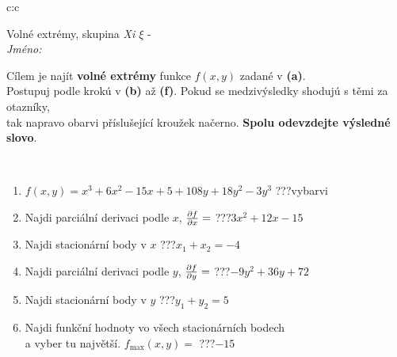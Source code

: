 \documentclass[10pt]{report}
\begin{document}
\newpage
\thispagestyle{empty}
\begin{tabular}{c:c}
\begin{minipage}[c][104.5mm][t]{0.5\linewidth}
\begin{center}
\vspace{7mm}
{\huge Volné extrémy, skupina \textit{Xi $\xi$} -}\\[5mm]
\textit{Jméno:}\phantom{xxxxxxxxxxxxxxxxxxxxxxxxxxxxxxxxxxxxxxxxxxxxxxxxxxxxxxxxxxxxxxxxx}\\[5mm]
\begin{minipage}{0.95\linewidth}
\begin{center}
Cílem je najít \textbf{volné extrémy} funkce $f(x,y)$ zadané v \textbf{(a)}.\\Postupuj podle krokú v \textbf{(b)} až \textbf{(f)}. Pokud se medzivýsledky shodujú s těmi za otazníky,\\tak napravo obarvi příslušející kroužek načerno. \textbf{Spolu odevzdejte výsledné slovo}.
\end{center}
\end{minipage}
\\[1mm]
\begin{minipage}{0.79\linewidth}
\begin{center}
\begin{varwidth}{\linewidth}
\begin{enumerate}
\normalsize
\item $f(x,y)=x^3+6x^2-15x+5+108y+18y^2-3y^3$\quad \dotfill\; ???\;\dotfill \quad vybarvi
\item Najdi parciální derivaci podle $x$, $\pdv{f}{x}=$\quad \dotfill\; ???\;\dotfill \quad $3x^2+12x-15$
\item Najdi stacionární body v $x$\quad \dotfill\; ???\;\dotfill \quad $x_1+x_2=-4$
\item Najdi parciální derivaci podle $y$, $\pdv{f}{y}=$\quad \dotfill\; ???\;\dotfill \quad $-9y^2+36y+72$
\item Najdi stacionární body v $y$\quad \dotfill\; ???\;\dotfill \quad $y_1+y_2=5$
\item Najdi funkční hodnoty vo všech stacionárních bodech \\ \phantom{xxxxxx} a vyber tu najvětší. $f_{\text{max}}(x,y)=$\quad \dotfill\; ???\;\dotfill \quad $-15$
\end{enumerate}
\end{varwidth}
\end{center}
\end{minipage}
\begin{minipage}{0.20\linewidth}

\end{minipage}
\end{center}
\end{minipage}
\end{tabular}
\end{document}
